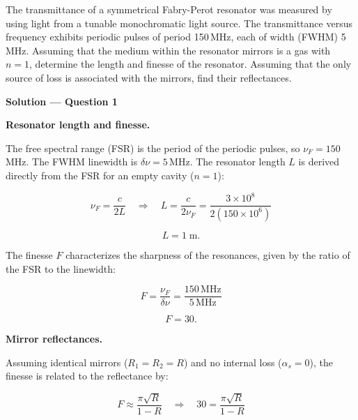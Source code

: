 
\begin{question}[Question 1]The transmittance of a symmetrical Fabry-Perot resonator was measured by
using light from a tunable monochromatic light source. The transmittance versus frequency
exhibits periodic pulses of period 150\,MHz, each of width (FWHM) 5\,MHz. Assuming that the
medium within the resonator mirrors is a gas with $n=1$, determine the length and finesse of
the resonator. Assuming that the only source of loss is associated with the mirrors, find their
reflectances.
\end{question}

\textbf{\large Solution --- Question 1}

\textbf{Resonator length and finesse.}

The free spectral range (FSR) is the period of the periodic pulses, so $\nu_F = 150$\,MHz. The FWHM linewidth is $\delta\nu = 5$\,MHz.
The resonator length $L$ is derived directly from the FSR for an empty cavity ($n=1$):

\begin{equation*}
  \nu_F = \frac{c}{2L} \quad\Longrightarrow\quad L = \frac{c}{2\nu_F} = \frac{3\times10^{8}}{2(150\times10^{6})}
\end{equation*}

\begin{equation*}
  \boxed{L = 1\;\text{m.}}
\end{equation*}

The finesse $F$ characterizes the sharpness of the resonances, given by the ratio of the FSR to the linewidth:

\begin{equation*}
  F = \frac{\nu_F}{\delta\nu} = \frac{150\,\text{MHz}}{5\,\text{MHz}}
\end{equation*}

\begin{equation*}
  \boxed{F = 30.}
\end{equation*}

\textbf{Mirror reflectances.}

Assuming identical mirrors ($R_1 = R_2 = R$) and no internal loss ($\alpha_s=0$), the finesse is related to the reflectance by:

\begin{equation*}
  F \approx \frac{\pi\sqrt{R}}{1-R} \quad\Longrightarrow\quad 30 = \frac{\pi\sqrt{R}}{1-R}
\end{equation*}

